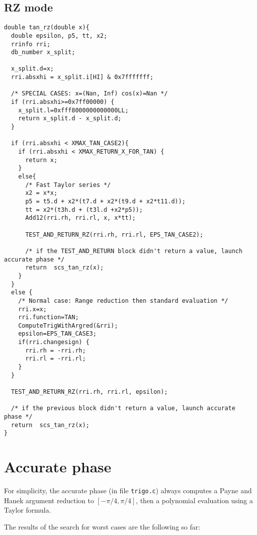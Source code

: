 \subsection{RZ mode}
\begin{lstlisting}[caption={Exceptional cases for tangent RZ},firstnumber=1]
double tan_rz(double x){  
  double epsilon, p5, tt, x2;
  rrinfo rri;
  db_number x_split;

  x_split.d=x;
  rri.absxhi = x_split.i[HI] & 0x7fffffff;
  
  /* SPECIAL CASES: x=(Nan, Inf) cos(x)=Nan */
  if (rri.absxhi>=0x7ff00000) {
    x_split.l=0xfff8000000000000LL;
    return x_split.d - x_split.d;
  }   
  
  if (rri.absxhi < XMAX_TAN_CASE2){
    if (rri.absxhi < XMAX_RETURN_X_FOR_TAN) {
      return x;
    }
    else{ 
      /* Fast Taylor series */
      x2 = x*x;
      p5 = t5.d + x2*(t7.d + x2*(t9.d + x2*t11.d));
      tt = x2*(t3h.d + (t3l.d +x2*p5));
      Add12(rri.rh, rri.rl, x, x*tt);  

      TEST_AND_RETURN_RZ(rri.rh, rri.rl, EPS_TAN_CASE2);

      /* if the TEST_AND_RETURN block didn't return a value, launch accurate phase */
      return  scs_tan_rz(x);
    }
  }
  else { 
    /* Normal case: Range reduction then standard evaluation */
    rri.x=x;
    rri.function=TAN;
    ComputeTrigWithArgred(&rri);
    epsilon=EPS_TAN_CASE3; 
    if(rri.changesign) {
      rri.rh = -rri.rh; 
      rri.rl = -rri.rl;
    }
  }

  TEST_AND_RETURN_RZ(rri.rh, rri.rl, epsilon);

  /* if the previous block didn't return a value, launch accurate phase */
  return  scs_tan_rz(x); 
}
\end{lstlisting}

 


\section{Accurate phase}

For simplicity, the accurate phase (in file \texttt{trigo.c}) always
computes a Payne and Hanek argument reduction to $[-\pi/4, \pi/4]$,
then a polynomial evaluation using a Taylor formula.

The results of the search for worst cases are the following so far:

